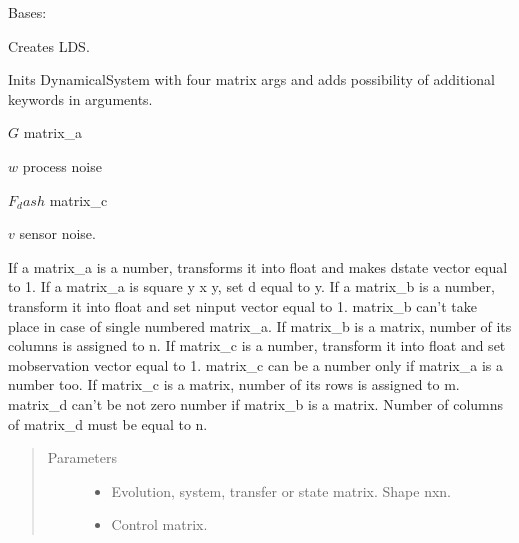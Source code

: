 \documentclass[letterpaper,10pt,english]{sphinxmanual}
\begin{document}
\begin{fulllineitems}
\label{\detokenize{LDS.LDS.ds:LDS.LDS.ds.dynamical_system.DynamicalSystem}}
\sphinxAtStartPar
Bases: 

\sphinxAtStartPar
Creates LDS.

\sphinxAtStartPar
Inits DynamicalSystem with four matrix args and
adds possibility of additional keywords in arguments.

\begin{DUlineblock}{0em}
\item[] \(G\) \sphinxhyphen{} matrix\_a
\item[] \(w\) \sphinxhyphen{} process noise
\item[] \(F_dash\) \sphinxhyphen{} matrix\_c
\item[] \(v\) \sphinxhyphen{} sensor noise.
\end{DUlineblock}

\sphinxAtStartPar
If a matrix\_a is a number, transforms it into float
and makes d\sphinxhyphen{}state vector equal to 1.
If a matrix\_a is square y x y, set d equal to y.
If a matrix\_b is a number, transform it into float
and set n\sphinxhyphen{}input vector equal to 1.
matrix\_b can’t take place in case of single numbered
matrix\_a.
If matrix\_b is a matrix, number of its columns is assigned to n.
If matrix\_c is a number, transform it into float
and set m\sphinxhyphen{}observation vector equal to 1.
matrix\_c can be a number only if matrix\_a is a number too.
If matrix\_c is a matrix, number of its rows is assigned to m.
matrix\_d can’t be not zero number if matrix\_b is a matrix.
Number of columns of matrix\_d must be equal to n.
\begin{quote}\begin{description}
\item[{Parameters}] \leavevmode\begin{itemize}
\item {} 
\sphinxAtStartPar
{} \textendash{} Evolution, system, transfer or state matrix.
Shape nxn.

\item {} 
\sphinxAtStartPar
{} \textendash{} Control matrix.


\end{itemize}
\end{description}
\end{quote}
\end{fulllineitems}
\end{document}
